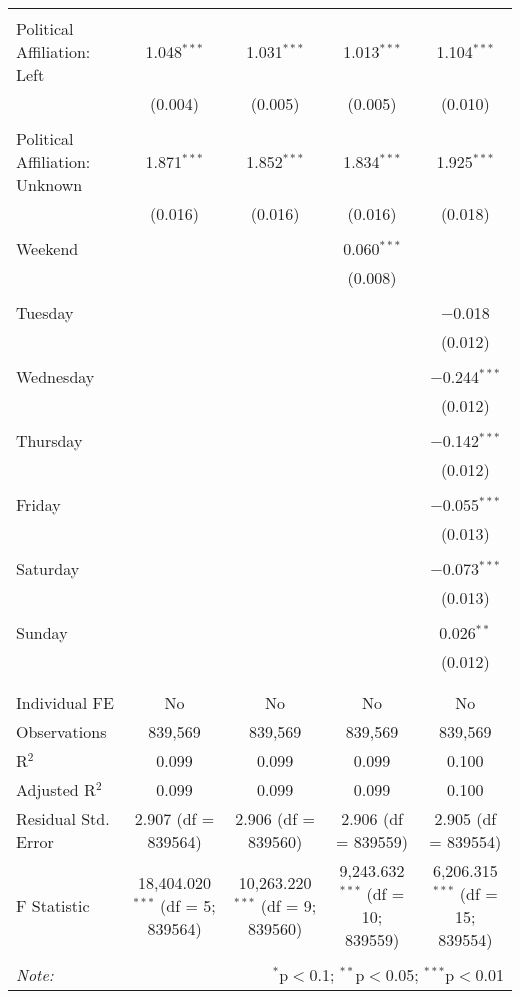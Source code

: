 \documentclass[
]{article}
\begin{document}
\begin{table}[!htbp]
{\begin{tabular}{@{\extracolsep{5pt}}lcccc}
  & & & & \\ 
 Political Affiliation: Left & 1.048$^{***}$ & 1.031$^{***}$ & 1.013$^{***}$ & 1.104$^{***}$ \\ 
  & (0.004) & (0.005) & (0.005) & (0.010) \\ 
  & & & & \\ 
 Political Affiliation: Unknown & 1.871$^{***}$ & 1.852$^{***}$ & 1.834$^{***}$ & 1.925$^{***}$ \\ 
  & (0.016) & (0.016) & (0.016) & (0.018) \\ 
  & & & & \\ 
 Weekend &  &  & 0.060$^{***}$ &  \\ 
  &  &  & (0.008) &  \\ 
  & & & & \\ 
 Tuesday &  &  &  & $-$0.018 \\ 
  &  &  &  & (0.012) \\ 
  & & & & \\ 
 Wednesday &  &  &  & $-$0.244$^{***}$ \\ 
  &  &  &  & (0.012) \\ 
  & & & & \\ 
 Thursday &  &  &  & $-$0.142$^{***}$ \\ 
  &  &  &  & (0.012) \\ 
  & & & & \\ 
 Friday &  &  &  & $-$0.055$^{***}$ \\ 
  &  &  &  & (0.013) \\ 
  & & & & \\ 
 Saturday &  &  &  & $-$0.073$^{***}$ \\ 
  &  &  &  & (0.013) \\ 
  & & & & \\ 
 Sunday &  &  &  & 0.026$^{**}$ \\ 
  &  &  &  & (0.012) \\ 
  & & & & \\ 
\hline \\[-1.8ex] 
Individual FE & No & No & No & No \\ 
Observations & 839,569 & 839,569 & 839,569 & 839,569 \\ 
R$^{2}$ & 0.099 & 0.099 & 0.099 & 0.100 \\ 
Adjusted R$^{2}$ & 0.099 & 0.099 & 0.099 & 0.100 \\ 
Residual Std. Error & 2.907 (df = 839564) & 2.906 (df = 839560) & 2.906 (df = 839559) & 2.905 (df = 839554) \\ 
F Statistic & 18,404.020$^{***}$ (df = 5; 839564) & 10,263.220$^{***}$ (df = 9; 839560) & 9,243.632$^{***}$ (df = 10; 839559) & 6,206.315$^{***}$ (df = 15; 839554) \\ 
\hline 
\hline \\[-1.8ex] 
\textit{Note:}  & \multicolumn{4}{r}{$^{*}$p$<$0.1; $^{**}$p$<$0.05; $^{***}$p$<$0.01} \\ 
\end{tabular}
} 
\end{table} 
\newpage
\end{document}
